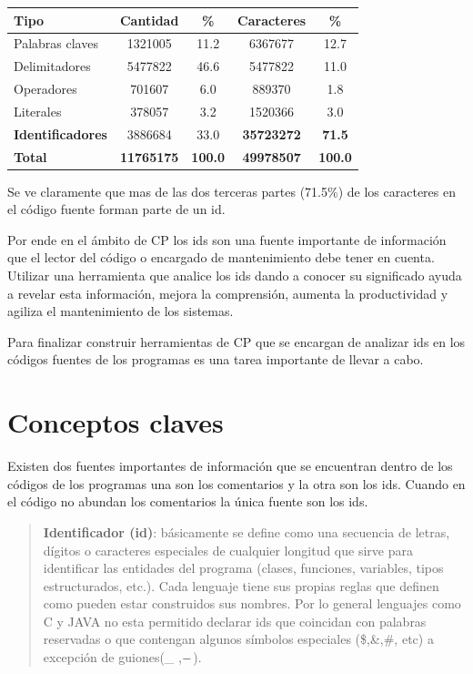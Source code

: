 \documentclass[12pt]{report}
\begin{document}
\begin{center}
   \begin{tabular}{| l | c | c | c | c | }
     \hline
     \textsf{Tipo} & \textsf{Cantidad} & \textsf{\%} & \textsf{Caracteres} & \textsf{\%} \\ \hline
     Palabras claves & 1321005 & 11.2 & 6367677 & 12.7 \\ \hline
     Delimitadores & 5477822 & 46.6 & 5477822 & 11.0 \\ \hline
     Operadores & 701607 & 6.0 & 889370 & 1.8 \\ \hline
     Literales & 378057 & 3.2 & 1520366 & 3.0 \\ \hline          
     \textbf{Identificadores} & 3886684 & 33.0 & \textbf{35723272} & \textbf{71.5} \\ \hline
     \textbf{Total} & \textbf{11765175} & \textbf{100.0} & \textbf{49978507} & \textbf{100.0} \\ \hline          
   \end{tabular}
\end{center}


Se ve claramente que mas de las dos terceras partes (71.5\%) de los caracteres en el código fuente forman parte de un id\cite{DFPM05,DMDJ13}. 

Por ende en el ámbito de CP los ids son una fuente importante de información que el lector del código o encargado de mantenimiento debe tener en cuenta. Utilizar una herramienta que analice los ids dando a conocer su significado ayuda a revelar esta información, mejora la comprensión, aumenta la productividad y agiliza el mantenimiento de los sistemas.

Para finalizar construir herramientas de CP que se encargan de analizar ids en los códigos fuentes de los programas es una tarea importante de llevar a cabo.

\section{Conceptos claves}

Existen dos fuentes importantes de información que se encuentran dentro de los códigos de los programas una son los comentarios y la otra son los ids. Cuando en el código no abundan los comentarios la única fuente son los ids.

\begin{verse}
\textbf{Identificador (id)}: básicamente se define como una secuencia de letras, dígitos o caracteres especiales de cualquier longitud que sirve para identificar las entidades del programa (clases, funciones, variables, tipos estructurados, etc.). 
Cada lenguaje tiene sus propias reglas que definen como pueden estar construidos sus nombres. Por lo general lenguajes como C y JAVA no esta permitido declarar ids que coincidan con palabras reservadas o que contengan algunos símbolos especiales (\$,\&,\#, etc) a excepción de guiones(\_ ,$\--$).
\end{verse}
\end{document}
